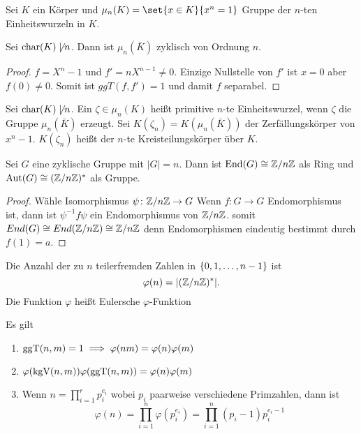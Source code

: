 \begin{Def}
    Sei $K$ ein Körper und $\mu_n(K)=\set{x\in K}{ x^n=1}$ Gruppe der $n$-ten Einheitswurzeln in $K$.
\end{Def}
\begin{Satz}
    Sei $\operatorname{char} (K) \not\mid n$. Dann ist $\mu_n(\bar K)$ zyklisch von Ordnung $n$.
\end{Satz}
\begin{proof}
    $f=X^n-1$ und $f'=nX^{n-1}\neq 0$. Einzige Nullstelle von $f'$ ist $x=0$ aber $f(0)\neq 0$. Somit ist $ggT(f,f')=1$ und damit $f$ separabel.
\end{proof}
\begin{Def}
    Sei $\operatorname{char} (K)\not\mid n$. Ein $\zeta\in\mu_n(K)$ heißt primitive $n$-te Einheitswurzel, wenn $\zeta$ die Gruppe $\mu_n(\bar K)$ erzeugt. Sei $K(\zeta_n)=K(\mu_n(\bar K))$ der Zerfällungskörper von $x^n-1$. $K(\zeta_n)$ heißt der $n$-te Kreisteilungskörper über $K$.
\end{Def}
\begin{Lemma}\label{Lem:MorGSn}
    Sei $G$ eine zyklische Gruppe mit $|G|=n$. Dann ist $\operatorname{End}(G)\cong \mathbb{Z}/n\mathbb{Z}$ als Ring und $\operatorname{Aut}(G)\cong (\mathbb{Z}/n\mathbb{Z})^*$ als Gruppe.
\end{Lemma}
\begin{proof}
    Wähle Isomorphismus $\psi\colon \mathbb{Z}/n\mathbb{Z}\to G$ Wenn $f\colon G\to G$ Endomorphismus ist, dann ist $\psi^{-1}f\psi$ ein Endomorphismus von $\mathbb{Z}/n\mathbb{Z}$.
    somit $End(G)\cong End(\mathbb{Z}/n\mathbb{Z})\cong \mathbb{Z}/n\mathbb{Z}$ denn Endomorphismen eindeutig bestimmt durch $f(1)=a$.
\end{proof}
\begin{Def}
   Die Anzahl der zu $n$ teilerfremden Zahlen in $\{0,1,\dots,n-1\}$ ist $$\varphi(n)=\lvert(\mathbb{Z}/n\mathbb{Z})^*\rvert.$$ Die Funktion $\varphi$ heißt Eulersche $\varphi$-Funktion
\end{Def}
\begin{Lemma} Es gilt
    \begin{enumerate}
        \item  $\operatorname{ggT}(n,m)=1\implies \varphi(nm)=\varphi(n)\varphi(m)$
        \item $\varphi(\operatorname{kgV}(n,m))\varphi(\operatorname{ggT}(n,m))=\varphi(n)\varphi(m)$
        \item Wenn $n=\prod_{i=1}^rp_i^{e_i}$ wobei $p_i$ paarweise verschiedene Primzahlen, dann ist 
        $$\varphi(n)=\prod_{i=1}^n\varphi(p_i^{e_i})=\prod_{i=1}^n(p_i-1)p_i^{e_i-1}$$
    \end{enumerate}
\end{Lemma}
